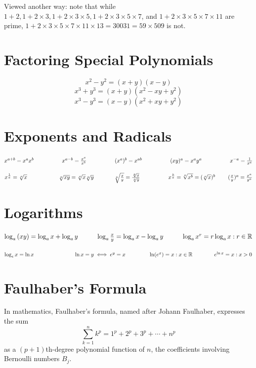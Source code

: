 \documentclass[10pt]{report}
\begin{document}
Viewed another way: note that while $1+2, 1+2\times 3, 1+2\times 3\times 5, 1+2\times 3\times 5\times 7$, and $1+2\times 3\times 5\times 7\times 11$ are prime, $1+2\times 3\times 5\times 7\times 11\times 13=30031=59\times 509$ is not.
\section{Factoring Special Polynomials}
$$x^2-y^2=(x+y)(x-y)$$
$$x^3+y^3=(x+y)(x^2-xy+y^2) $$
$$x^3-y^3=(x-y)(x^2+xy+y^2) $$
\section{Exponents and Radicals}

$x^{a+b}=x^{a}x^{b}\hspace*{1.8cm}x^{a-b}=\frac{x^{a}}{x^{b}}\hspace*{1.8cm}(x^{a})^{b}=x^{ab}\hspace*{1.8cm}(xy)^{a}=x^{a}y^{a}\hspace*{1.8cm}x^{-a}=\frac{1}{x^a}$

$x^{\frac{1}{a}}=\sqrt[a]{x}\hspace*{2cm}\sqrt[a]{xy}=\sqrt[a]{x}\sqrt[a]{y}\hspace*{1.3cm}\sqrt[a]{\frac{x}{y}}=\frac{\sqrt[a]{x}}{\sqrt[a]{y}}\hspace*{1.8cm}x^{\frac{b}{a}}=\sqrt[a]{x^b}=(\sqrt[a]{x})^b \hspace*{.8cm}(\frac{x}{y})^a=\frac{x^a}{y^a}$
\section{Logarithms}
$\log_a{(xy)}=\log_a{x}+\log_a{y} \hspace*{1cm} \log_a{\frac{x}{y}}=\log_a{x} -\log_a{y}\hspace*{1cm} \log_a{x^r}= r\log_a{x} :r\in\mathbb{R}$

$\log_e{x}=\ln{x}\hspace*{2.6cm} \ln{x} = y \iff e^y=x \hspace*{1.5cm} \ln(e^x)=x:x\in\mathbb{R} \hspace*{1.4 cm} e^{\ln{x}}=x: x>0$
\section{Faulhaber's Formula}
In mathematics, Faulhaber's formula, named after Johann Faulhaber, expresses the sum
$$\sum_{k=1}^n k^p = 1^p + 2^p + 3^p + \cdots + n^p$$
as a $(p + 1)$th-degree polynomial function of $n$, the coefficients involving Bernoulli numbers $B_j$.
\end{document}
